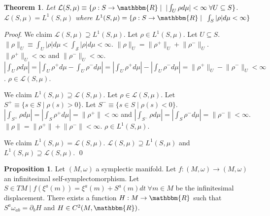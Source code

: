 \documentclass[aps,pra,10pt,twocolumn,floatfix,nofootinbib]{revtex4-1}
\numberwithin{equation}{section}
\newtheorem{thrm}[equation]{Theorem}
\theoremstyle{definition}
\newtheorem{prop}[equation]{Proposition}
\renewenvironment{proof}{\emph{Proof}.}{\qed}
\begin{document}
\begin{thrm}\label{everywhere_integrable_is_lebesgue_integrable}
	Let $\mathcal{L}(S,\mu) \equiv \{ \rho : S \rightarrow \mathbbm{R} \; | \;\; |\int_{U} \rho d\mu| < \infty \; \forall U \subseteq S\}$. $\mathcal{L}(S,\mu)=L^1(S,\mu)$ where $L^1(S,\mu) = \{ \rho : S \rightarrow \mathbbm{R} \; | \;\; \int_{S} |\rho| d\mu < \infty \}$
\end{thrm}

\begin{proof}
	We claim $\mathcal{L}(S,\mu) \supseteq L^1(S,\mu)$. Let $\rho \in L^1(S,\mu)$. Let $U \subseteq S$. $\lVert \rho \rVert_U \equiv \int_{U} |\rho| d\mu < \int_{\mathcal{S}} |\rho| d\mu < \infty$. $\lVert \rho \rVert_U = \lVert \rho^+ \rVert_U + \lVert \rho^- \rVert_U$. $\lVert \rho^+ \rVert_U < \infty$ and $\lVert \rho^- \rVert_U < \infty$. $|\int_{U} \rho d\mu| = |\int_{U} \rho^+ d\mu - \int_{U} \rho^- d\mu| = |\int_{U} \rho^+ d\mu| - |\int_{U} \rho^- d\mu| = \lVert \rho^+ \rVert_U - \lVert \rho^- \rVert_U < \infty$. $\rho \in\mathcal{L}(S,\mu)$.
	
	We claim $L^1(S,\mu) \supseteq \mathcal{L}(S,\mu)$.  Let $\rho \in \mathcal{L}(S,\mu)$. Let $S^+ \equiv  \{ s \in S \; | \; \rho(s) > 0\}$. Let $S^- \equiv  \{ s \in S \; | \; \rho(s) < 0\}$. $|\int_{S^+} \rho d\mu| = |\int_{S} \rho^+ d\mu| = \lVert \rho^+ \rVert < \infty$ and $|\int_{S^-} \rho d\mu| = |\int_{S} \rho^- d\mu| = \lVert \rho^- \rVert < \infty$. $\lVert \rho \rVert = \lVert \rho^+ \rVert + \lVert \rho^- \rVert < \infty$. $\rho \in L^1(S,\mu)$.
	
	We claim $L^1(S,\mu) = \mathcal{L}(S,\mu)$. $\mathcal{L}(S,\mu) \supseteq L^1(S,\mu)$ and $L^1(S,\mu) \supseteq \mathcal{L}(S,\mu)$.	
\end{proof}

\begin{prop}\label{symplectomorphism_generator}
	Let $(M, \omega)$ a symplectic manifold. Let $f: (M, \omega) \rightarrow (M, \omega)$ an infinitesimal self-symplectomorphism. Let $S \in TM \; | \; f(\xi^a(m)) = \xi^a(m) + S^a(m)dt \; \forall m \in M$ be the infinitesimal displacement. There exists a function $H: M \rightarrow \mathbbm{R}$ such that $S^{a} \omega_{ab} = \partial_{b}H$ and $H \in C^2(M, \mathbbm{R})$.
\end{prop}
\end{document}
